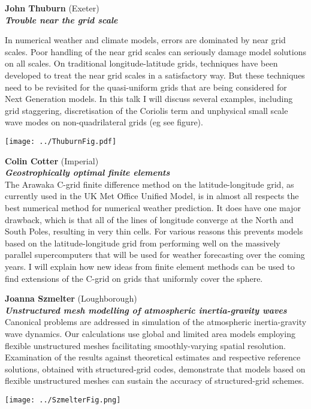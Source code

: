\begin{minipage}{0.64\linewidth}\raggedright
{\bf John Thuburn} (Exeter) \\
\textbf{\textit{Trouble near the grid scale}}

In numerical weather and climate models, errors are dominated by near grid scales. Poor handling of the near grid scales can seriously damage model solutions on all scales. On traditional longitude-latitude grids, techniques have been developed to treat the near grid scales in a satisfactory way. But these techniques need to be revisited for the quasi-uniform grids that are being considered for Next Generation models. In this talk I will discuss several examples, including grid staggering, discretisation of the Coriolis term and unphysical small scale wave modes on non-quadrilateral grids (eg see figure). 
\end{minipage}
%
\begin{minipage}{0.35\linewidth}
\texttt{[image: ../ThuburnFig.pdf]}
\end{minipage}

\begin{minipage}{\linewidth}\raggedright
{\bf Colin Cotter} (Imperial) \\
\textbf{\textit{Geostrophically optimal finite elements}}
\\
The Arawaka C-grid finite difference method on the latitude-longitude grid, as currently used in the UK Met Office Unified Model, is in almost all respects the best numerical method for numerical weather prediction. It does have one major drawback, which is that all of the lines of longitude converge at the North and South Poles, resulting in very thin cells. For various reasons this prevents models based on the latitude-longitude grid from performing well on the massively parallel supercomputers that will be used for weather forecasting over the coming years. I will explain how new ideas from finite element methods can be used to find extensions of the C-grid on grids that uniformly cover the sphere.
\end{minipage}

\begin{minipage}{\linewidth}\raggedright
{\bf Joanna Szmelter} (Loughborough) \\
\textbf{\textit{Unstructured mesh modelling of atmospheric inertia-gravity waves}}
\\
Canonical problems are addressed in simulation of the atmospheric inertia-gravity wave dynamics. Our calculations use global and limited area models employing flexible unstructured meshes facilitating smoothly-varying spatial resolution. Examination of the results against theoretical estimates and respective reference solutions, obtained with structured-grid codes, demonstrate that models based on flexible unstructured meshes can sustain the accuracy of structured-grid schemes.

\begin{center}
\texttt{[image: ../SzmelterFig.png]}
\end{center}
\end{minipage}

